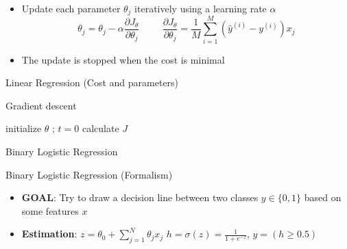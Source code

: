 \documentclass{KBook}
\begin{document}
	\begin{itemize}
		
		\item Update each parameter $ \theta_j $ iteratively using a learning rate $ \alpha $
		\[\theta_j = \theta_j - \alpha \frac{\partial J_\theta}{\partial \theta_j}
		\hspace{1cm}
		\frac{\partial J_\theta}{\partial \theta_j} = \frac{1}{M} \sum\limits_{i=1}^{M} (\hat{y}^{(i)} - y^{(i)}) x_j
		\]
		\item The update is stopped when the cost is minimal
	\end{itemize}
	
	Linear Regression (Cost and parameters)
	
	\begin{minipage}{0.7\textwidth} 
		\begin{block}{Gradient descent}
			\begin{algorithm}[H]
				\KwResult{$ \theta $}
				initialize $ \theta $ ; $ t = 0 $\;
				calculate $ J $\;
			\end{algorithm}
		\end{block}
	\end{minipage}
	\begin{minipage}{0.29\textwidth} 
	\end{minipage}
	
	Binary Logistic Regression
	
	\begin{minipage}{0.5\textwidth} 
	\end{minipage}
	\begin{minipage}{0.49\textwidth} 
	\end{minipage}
	
	Binary Logistic Regression (Formalism)
	
	\begin{minipage}{0.5\textwidth} 
		\begin{itemize}
			\item \textbf{GOAL}: Try to draw a decision line between two classes $ y \in \{0, 1\} $ based on some features $ x $
			\item \textbf{Estimation}: $ z = \theta_0 + \sum_{j=1}^{N} \theta_j x_j $
			$ h = \sigma(z) = \frac{1}{1 + e^{-z}}$, $ \hat{y} = (h \ge 0.5)$
		\end{itemize}
	\end{minipage}
	\begin{minipage}{0.49\textwidth} 
	\end{minipage}
	
\end{document}
